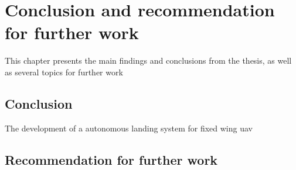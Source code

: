 \chapter{Conclusion and recommendation for further work}
This chapter presents the main findings and conclusions from the thesis, as well as several topics for further work
\section{Conclusion}
The development of a autonomous landing system for fixed wing \gls{uav}
\section{Recommendation for further work}